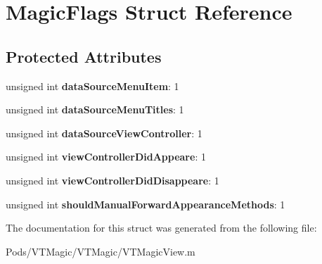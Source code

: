\hypertarget{struct_magic_flags}{}\section{Magic\+Flags Struct Reference}
\label{struct_magic_flags}
\subsection*{Protected Attributes}
\begin{DoxyCompactItemize}
\item 
\mbox{\label{struct_magic_flags_a08c4b58c2858404eb4d6380ab61c0b64}} 
unsigned int {\bfseries data\+Source\+Menu\+Item}\+: 1
\item 
\mbox{\label{struct_magic_flags_a06f9d009ddd342ac2894d3dfa90b6dd7}} 
unsigned int {\bfseries data\+Source\+Menu\+Titles}\+: 1
\item 
\mbox{\label{struct_magic_flags_aac86c9fc4e03532ebe49861a3bced1a5}} 
unsigned int {\bfseries data\+Source\+View\+Controller}\+: 1
\item 
\mbox{\label{struct_magic_flags_a761e4a15b4d4a07e59492b1f933c2342}} 
unsigned int {\bfseries view\+Controller\+Did\+Appeare}\+: 1
\item 
\mbox{\label{struct_magic_flags_a4bac8b083e43680a69cd8818e103cd92}} 
unsigned int {\bfseries view\+Controller\+Did\+Disappeare}\+: 1
\item 
\mbox{\label{struct_magic_flags_a9dff0e877cdc0af757a05d2efefa3c0b}} 
unsigned int {\bfseries should\+Manual\+Forward\+Appearance\+Methods}\+: 1
\end{DoxyCompactItemize}


The documentation for this struct was generated from the following file\+:\begin{DoxyCompactItemize}
\item 
Pods/\+V\+T\+Magic/\+V\+T\+Magic/V\+T\+Magic\+View.\+m\end{DoxyCompactItemize}

